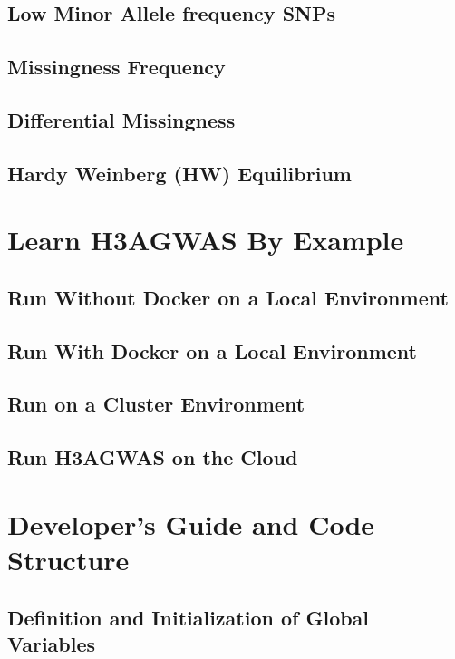 \documentclass{article}
\begin{document}
\subsection{Low Minor Allele frequency SNPs}
\subsection{Missingness Frequency}
\subsection{Differential Missingness}
\subsection{Hardy Weinberg (HW) Equilibrium}
\vspace{1em} %

\section{Learn H3AGWAS By Example}
\subsection{Run Without Docker on a Local Environment}
\subsection{Run With Docker on a Local Environment}
\subsection{Run on a Cluster Environment}
\subsection{Run H3AGWAS on the Cloud}
\vspace{1em} %





\section{Developer's Guide and Code Structure}
\subsection{Definition and Initialization of Global Variables}
\end{document}
